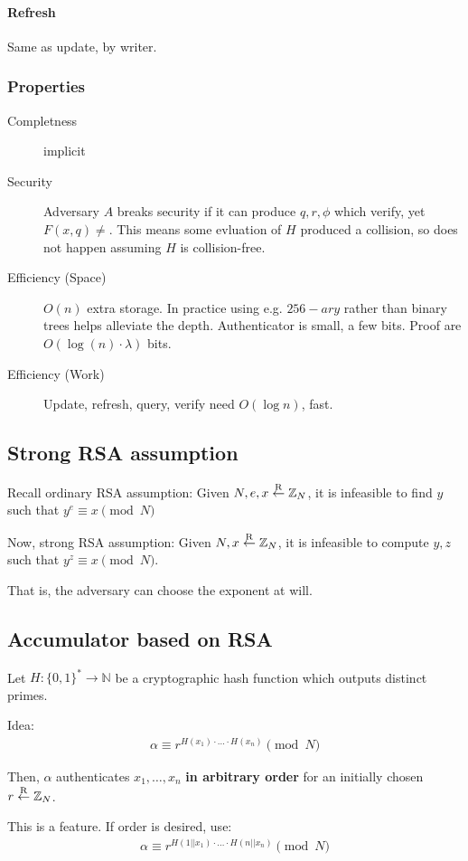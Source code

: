 \paragraph{Refresh}

Same as update, by writer.

\subsubsection{Properties}

\begin{description}
		\item[Completness] implicit
		\item[Security] Adversary $A$ breaks security if it can produce $q, r,
				\phi$ which verify, yet $F(x, q) \neq $. This means some
				evluation of $H$ produced a collision, so does not happen
				assuming $H$ is collision-free.
		\item[Efficiency (Space)] $O(n)$ extra storage. In practice using e.g.
				$256-ary$ rather than binary trees helps alleviate the depth.
				Authenticator is small, a few bits. Proof are $O(\log(n) \cdot
				\lambda)$ bits.
		\item[Efficiency (Work)] Update, refresh, query, verify need $O(\log
				n)$, fast.
\end{description}

\subsection{Strong RSA assumption}

Recall ordinary RSA assumption: Given $N, e, x \overset{\mathrm{R}}{\gets} \mathbb{Z}_N$, it is
infeasible to find $y$ such that $y^e \equiv x \pmod{N}$

Now, strong RSA assumption: Given $N, x \overset{\mathrm{R}}{\gets} \mathbb{Z}_N$, it is infeasible
to compute $y, z$ such that $y^z \equiv x \pmod{N}$.

That is, the adversary can choose the exponent at will.

\subsection{Accumulator based on RSA}

Let $H : \{0, 1\}^* \rightarrow \mathbb{N}$ be a cryptographic hash function
which outputs distinct primes.

Idea:
\begin{align*}
		\alpha \equiv r^{H(x_1) \cdot \ldots \cdot H(x_n)} \pmod{N}
\end{align*}

Then, $\alpha$ authenticates $x_1, \ldots, x_n$ \textbf{in arbitrary order} for
an initially chosen $r \overset{\mathrm{R}}{\gets} \mathbb{Z}_N$.

This is a feature. If order is desired, use:
\begin{align*}
		\alpha \equiv r^{H(1 || x_1) \cdot \ldots \cdot H(n || x_n)} \pmod{N}
\end{align*}
